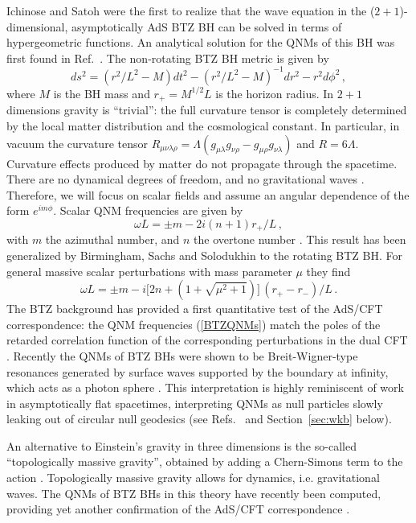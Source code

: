 \documentclass[]{iopart}
\def\be{\begin{equation}}
\def\ee{\end{equation}}
\begin{document}
Ichinose and Satoh \cite{Ichinose:1994rg} were the first to realize that the
wave equation in the ($2+1$)-dimensional, asymptotically AdS BTZ BH
\cite{Banados:1992wn} can be solved in terms of hypergeometric functions. An
analytical solution for the QNMs of this BH was first found in
Ref.~\cite{Cardoso:2001hn}.  The non-rotating BTZ BH metric is given by
\cite{Banados:1992wn}
%
\be ds^{2}= \left (r^2/L^2-M\right )dt^{2}-
 \left (r^2/L^2-M \right )^{-1}dr^{2} - r^2d{\phi}^2
\,, \label{metricbtz} \ee
%
where $M$ is the BH mass and $r_+ =M^{1/2}L$ is the horizon radius. In $2+1$
dimensions gravity is ``trivial'': the full curvature tensor is completely
determined by the local matter distribution and the cosmological constant. In
particular, in vacuum the curvature tensor $R_{\mu\nu\lambda\rho}=\Lambda\left
(g_{\mu \lambda}g_{\nu\rho}-g_{\mu\rho}g_{\nu\lambda}\right )$ and
$R=6\Lambda$. Curvature effects produced by matter do not propagate through
the spacetime. There are no dynamical degrees of freedom, and no gravitational
waves \cite{Brown:1988am,Cardoso:2002pa}. Therefore, we will focus on scalar
fields and assume an angular dependence of the form $e^{im\phi}$.  Scalar QNM
frequencies are given by
%
\be \omega L=\pm m-2i(n+1)r_+/L\,,
\ee
%
with $m$ the azimuthal number, and $n$ the overtone number
\cite{Cardoso:2001hn}. This result has been generalized by Birmingham, Sachs
and Solodukhin \cite{Birmingham:2001pj} to the rotating BTZ BH. For general
massive scalar perturbations with mass parameter $\mu$ they find
%
\be \omega L=\pm m-i \lbrack
2n+(1+\sqrt{\mu^2+1})\rbrack\,(r_+-r_-)/L\,.
\label{BTZQNMs}
\ee
%
The BTZ background has provided a first quantitative test of the AdS/CFT
correspondence: the QNM frequencies (\ref{BTZQNMs}) match the poles of the
retarded correlation function of the corresponding perturbations in the dual
CFT \cite{Birmingham:2001pj}.  Recently the QNMs of BTZ BHs were shown to be
Breit-Wigner-type resonances generated by surface waves supported by the
boundary at infinity, which acts as a photon sphere \cite{Decanini:2009dn}.
This interpretation is highly reminiscent of work in asymptotically flat
spacetimes, interpreting QNMs as null particles slowly leaking out of circular
null geodesics (see
Refs.~\cite{goebel,mashhoon,Ferrari:1984zz,stewart,Decanini:2002ha,
  Cardoso:2008bp,Decanini:2009mu} and Section~\ref{sec:wkb} below).

An alternative to Einstein's gravity in three dimensions is the so-called
``topologically massive gravity'', obtained by adding a Chern-Simons term to
the action \cite{Deser:1981wh,Deser:1982vy}. Topologically massive gravity
allows for dynamics, i.e. gravitational waves.  The QNMs of BTZ BHs in this
theory have recently been computed, providing yet another confirmation of the
AdS/CFT correspondence \cite{Sachs:2008gt,Sachs:2008yi}.
\end{document}

